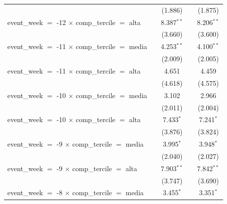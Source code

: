 \begin{tabular}{lcccc}
                                                           &                & (1.886)       &              & (1.875)\\   
   event\_week $=$ -12 $\times$ comp\_tercile $=$ alta     &                & 8.387$^{**}$  &              & 8.206$^{**}$\\   
                                                           &                & (3.660)       &              & (3.600)\\   
   event\_week $=$ -11 $\times$ comp\_tercile $=$ media    &                & 4.253$^{**}$  &              & 4.100$^{**}$\\   
                                                           &                & (2.009)       &              & (2.005)\\   
   event\_week $=$ -11 $\times$ comp\_tercile $=$ alta     &                & 4.651         &              & 4.459\\   
                                                           &                & (4.618)       &              & (4.575)\\   
   event\_week $=$ -10 $\times$ comp\_tercile $=$ media    &                & 3.102         &              & 2.966\\   
                                                           &                & (2.011)       &              & (2.004)\\   
   event\_week $=$ -10 $\times$ comp\_tercile $=$ alta     &                & 7.433$^{*}$   &              & 7.241$^{*}$\\   
                                                           &                & (3.876)       &              & (3.824)\\   
   event\_week $=$ -9 $\times$ comp\_tercile $=$ media     &                & 3.995$^{*}$   &              & 3.948$^{*}$\\   
                                                           &                & (2.040)       &              & (2.027)\\   
   event\_week $=$ -9 $\times$ comp\_tercile $=$ alta      &                & 7.903$^{**}$  &              & 7.842$^{**}$\\   
                                                           &                & (3.747)       &              & (3.690)\\   
   event\_week $=$ -8 $\times$ comp\_tercile $=$ media     &                & 3.455$^{*}$   &              & 3.351$^{*}$\\   

\end{tabular}
